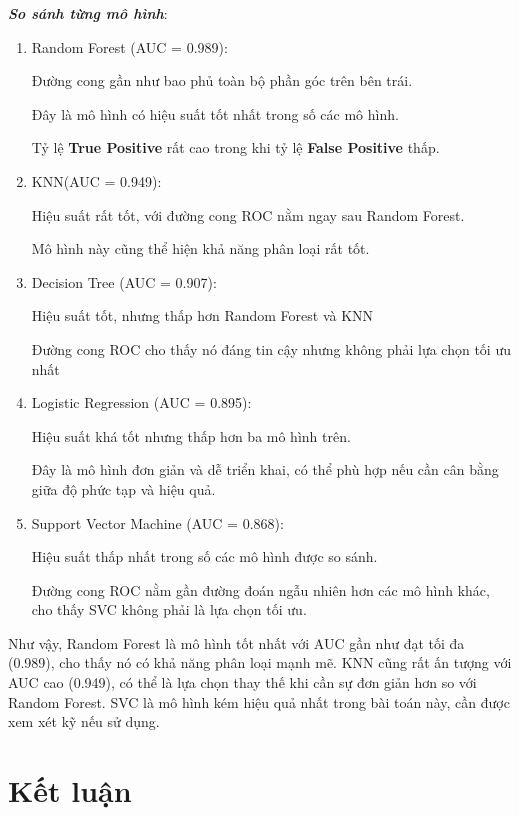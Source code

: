 \documentclass[11pt]{article}
\begin{document}
	\textbf{\textit{So sánh từng mô hình}}:
	\vspace{0.1cm}
	\begin{enumerate}
		\item Random Forest (AUC = 0.989):
		
		Đường cong gần như bao phủ toàn bộ phần góc trên bên trái.
		
		Đây là mô hình có hiệu suất tốt nhất trong số các mô hình.
		
		Tỷ lệ \textbf{True Positive} rất cao trong khi tỷ lệ \textbf{False Positive} thấp.
		
		\item KNN(AUC = 0.949):
		
		Hiệu suất rất tốt, với đường cong ROC nằm ngay sau Random Forest.
		
		Mô hình này cũng thể hiện khả năng phân loại rất tốt.
		
		\item Decision Tree (AUC = 0.907):
		
		Hiệu suất tốt, nhưng thấp hơn Random Forest và KNN
		
		Đường cong ROC cho thấy nó đáng tin cậy nhưng không phải lựa chọn tối ưu nhất
		
		\item Logistic Regression (AUC = 0.895):
		
		Hiệu suất khá tốt nhưng thấp hơn ba mô hình trên.
		
		Đây là mô hình đơn giản và dễ triển khai, có thể phù hợp nếu cần cân bằng giữa độ phức tạp và hiệu quả.
		
		\item Support Vector Machine (AUC = 0.868):
		
		Hiệu suất thấp nhất trong số các mô hình được so sánh.
		
		Đường cong ROC nằm gần đường đoán ngẫu nhiên hơn các mô hình khác, cho thấy SVC không phải là lựa chọn tối ưu.
	\end{enumerate}
	
	Như vậy, Random Forest là mô hình tốt nhất với AUC gần như đạt tối đa (0.989), cho thấy nó có khả năng phân loại mạnh mẽ. KNN cũng rất ấn tượng với AUC cao (0.949), có thể là lựa chọn thay thế khi cần sự đơn giản hơn so với Random Forest. SVC là mô hình kém hiệu quả nhất trong bài toán này, cần được xem xét kỹ nếu sử dụng.
	
	\section{Kết luận}
	
\end{document}
